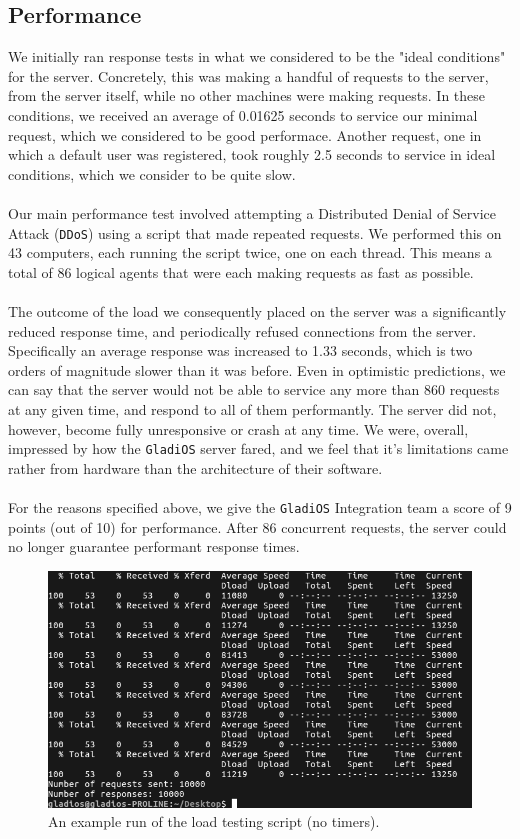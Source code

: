 \documentclass[12pt,a4paper,titlepage]{article}
\begin{document}
\subsection{Performance}

We initially ran response tests in what we considered to be the "ideal
conditions" for the server. Concretely, this was making a handful of requests to
the server, from the server itself, while no other machines were making
requests. In these conditions, we received  an average of 0.01625 seconds to
service our minimal request, which we considered to be good performace. Another
request, one in which a default user was registered, took roughly 2.5 seconds to
 service in ideal conditions, which we consider to be quite slow.
\\\\
Our main performance test involved attempting a Distributed Denial of Service
Attack (\texttt{DDoS}) using a script that made repeated requests. We performed this on
43 computers, each running the script twice, one on each thread. This means a
total of 86 logical agents that were each making requests as fast as possible.
\\\\
The outcome of the load we consequently placed on the server was a significantly
reduced response time, and periodically refused connections from the server.
Specifically an average response was increased to 1.33 seconds, which is two
orders of magnitude slower than it was before. Even in optimistic predictions,
we can say that the server would not be able to service any more than 860
requests at any given time, and respond to all of them performantly. The server
did not, however, become fully unresponsive or crash at any time. We were,
overall, impressed by how the \texttt{GladiOS} server fared, and we feel that it's
limitations came rather from hardware than the architecture of their software.
\\\\
For the reasons specified above, we give the \texttt{GladiOS} Integration team a score of
 9 points (out of 10) for performance. After 86 concurrent requests, the server
 could no longer guarantee performant response times.

 \begin{figure}[!ht]
 	\includegraphics[width=\textwidth]{image2.png}
 	\caption{An example run of the load testing script (no timers).}
 	\label{}
 \end{figure}
\end{document}
